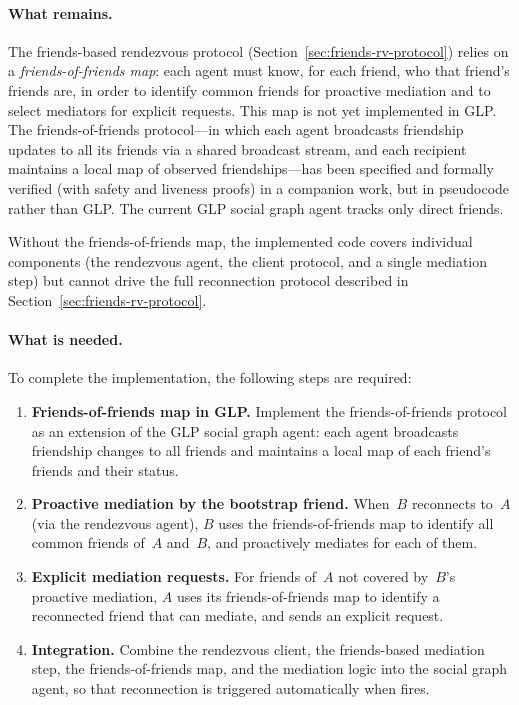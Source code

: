 \paragraph{What remains.}
The friends-based rendezvous protocol (Section~\ref{sec:friends-rv-protocol}) relies on a \emph{friends-of-friends map}: each agent must know, for each friend, who that friend's friends are, in order to identify common friends for proactive mediation and to select mediators for explicit requests.  This map is not yet implemented in GLP.  The friends-of-friends protocol---in which each agent broadcasts friendship updates to all its friends via a shared broadcast stream, and each recipient maintains a local map of observed friendships---has been specified and formally verified (with safety and liveness proofs) in a companion work, but in pseudocode rather than GLP.  The current GLP social graph agent tracks only direct friends.

Without the friends-of-friends map, the implemented code covers individual components (the rendezvous agent, the client protocol, and a single mediation step) but cannot drive the full reconnection protocol described in Section~\ref{sec:friends-rv-protocol}.

\paragraph{What is needed.}
To complete the implementation, the following steps are required:
\begin{enumerate}
\item \textbf{Friends-of-friends map in GLP.}  Implement the friends-of-friends protocol as an extension of the GLP social graph agent: each agent broadcasts friendship changes to all friends and maintains a local map of each friend's friends and their status.
\item \textbf{Proactive mediation by the bootstrap friend.}  When~$B$ reconnects to~$A$ (via the rendezvous agent), $B$ uses the friends-of-friends map to identify all common friends of~$A$ and~$B$, and proactively mediates for each of them.
\item \textbf{Explicit mediation requests.}  For friends of~$A$ not covered by~$B$'s proactive mediation, $A$ uses its friends-of-friends map to identify a reconnected friend that can mediate, and sends an explicit request.
\item \textbf{Integration.}  Combine the rendezvous client, the friends-based mediation step, the friends-of-friends map, and the mediation logic into the social graph agent, so that reconnection is triggered automatically when  fires.
\end{enumerate}

